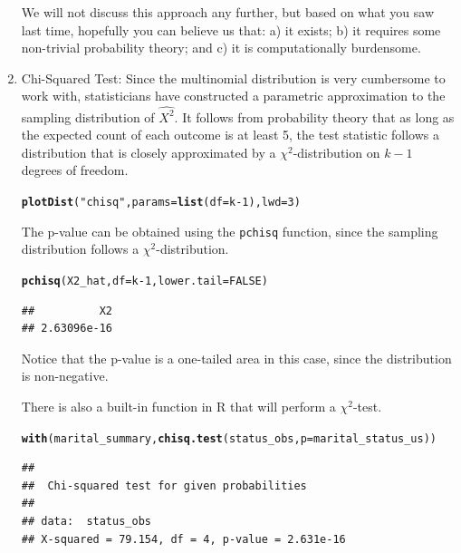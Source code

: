 \documentclass[10pt]{article}\usepackage[]{graphicx}\usepackage[]{color}
\makeatletter
\newcommand{\hlnum}[1]{\textcolor[rgb]{0.686,0.059,0.569}{#1}}%
\newcommand{\hlstr}[1]{\textcolor[rgb]{0.192,0.494,0.8}{#1}}%
\newcommand{\hlopt}[1]{\textcolor[rgb]{0,0,0}{#1}}%
\newcommand{\hlstd}[1]{\textcolor[rgb]{0.345,0.345,0.345}{#1}}%
\newcommand{\hlkwc}[1]{\textcolor[rgb]{0.333,0.667,0.333}{#1}}%
\newcommand{\hlkwd}[1]{\textcolor[rgb]{0.737,0.353,0.396}{\textbf{#1}}}%
\newenvironment{kframe}{%
 \def\at@end@of@kframe{}%
 \ifinner\ifhmode%
  \def\at@end@of@kframe{\end{minipage}}%
  \begin{minipage}{\columnwidth}%
 \fi\fi%
 \def\FrameCommand##1{\hskip\@totalleftmargin \hskip-\fboxsep
 \colorbox{shadecolor}{##1}\hskip-\fboxsep
     \hskip-\linewidth \hskip-\@totalleftmargin \hskip\columnwidth}%
 \MakeFramed {\advance\hsize-\width
   \@totalleftmargin\z@ \linewidth\hsize
   \@setminipage}}%
 {\par\unskip\endMakeFramed%
 \at@end@of@kframe}
\newenvironment{knitrout}{}{} %
\newcommand{\R}{{\sf R}\xspace}
\newcommand{\cmd}[1]{\texttt{#1}}
\makeatother
\begin{document}
\begin{enumerate}
  We will not discuss this approach any further, but based on what you saw last time, hopefully you can believe us that: a) it exists; b) it requires some non-trivial probability theory; and c) it is computationally burdensome. 
  
  \item Chi-Squared Test: Since the multinomial distribution is very cumbersome to work with, statisticians have constructed a parametric approximation to the sampling distribution of $\hat{X^2}$. It follows from probability theory that as long as the expected count of each outcome is at least 5, the test statistic follows a distribution that is closely approximated by a $\chi^2$-distribution on $k-1$ degrees of freedom. 
  
\begin{knitrout}
\color{fgcolor}\begin{kframe}
\begin{alltt}
\hlkwd{plotDist}\hlstd{(}\hlstr{"chisq"}\hlstd{,} \hlkwc{params} \hlstd{=} \hlkwd{list}\hlstd{(}\hlkwc{df} \hlstd{= k}\hlopt{-}\hlnum{1}\hlstd{),} \hlkwc{lwd} \hlstd{=} \hlnum{3}\hlstd{)}
\end{alltt}
\end{kframe}
\end{knitrout}

The p-value can be obtained using the \cmd{pchisq} function, since the sampling distribution follows a $\chi^2$-distribution.

\begin{knitrout}
\color{fgcolor}\begin{kframe}
\begin{alltt}
\hlkwd{pchisq}\hlstd{(X2_hat,} \hlkwc{df} \hlstd{= k}\hlopt{-}\hlnum{1}\hlstd{,} \hlkwc{lower.tail} \hlstd{=} \hlnum{FALSE}\hlstd{)}
\end{alltt}
\begin{verbatim}
##          X2 
## 2.63096e-16
\end{verbatim}
\end{kframe}
\end{knitrout}

  Notice that the p-value is a one-tailed area in this case, since the distribution is non-negative. 

  There is also a built-in function in \R that will perform a $\chi^2$-test. 
  
\begin{knitrout}\footnotesize
{}\color{fgcolor}\begin{kframe}
\begin{alltt}
\hlkwd{with}\hlstd{(marital_summary,} \hlkwd{chisq.test}\hlstd{(status_obs,} \hlkwc{p} \hlstd{= marital_status_us))}
\end{alltt}
\begin{verbatim}
## 
## 	Chi-squared test for given probabilities
## 
## data:  status_obs
## X-squared = 79.154, df = 4, p-value = 2.631e-16
\end{verbatim}
\end{kframe}
\end{knitrout}


\end{enumerate}
\end{document}
